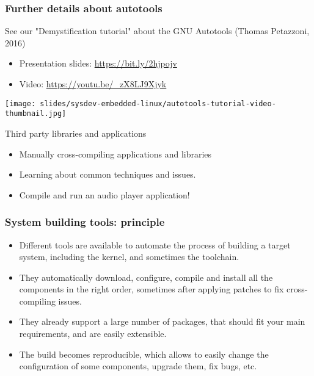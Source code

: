 \begin{frame}
  \frametitle{Further details about autotools}
  See our "Demystification tutorial" about the GNU Autotools (Thomas Petazzoni, 2016)
  \begin{itemize}
     \item Presentation slides: \url{https://bit.ly/2hjpojv}
     \item Video: \url{https://youtu.be/_zX8LJ9Xjyk}
  \end{itemize}
  \vfill
  \texttt{[image: slides/sysdev-embedded-linux/autotools-tutorial-video-thumbnail.jpg]}
\end{frame}

\setuplabframe
{Third party libraries and applications}
{
  \begin{itemize}
  \item Manually cross-compiling applications and libraries
  \item Learning about common techniques and issues.
  \item Compile and run an audio player application!
  \end{itemize}
}

\begin{frame}
  \frametitle{System building tools: principle}
  \begin{itemize}
  \item Different tools are available to automate the process of
    building a target system, including the kernel, and sometimes the
    toolchain.
  \item They automatically download, configure, compile and install
    all the components in the right order, sometimes after applying
    patches to fix cross-compiling issues.
  \item They already support a large number of packages, that should
    fit your main requirements, and are easily extensible.
  \item The build becomes reproducible, which allows to easily change
    the configuration of some components, upgrade them, fix bugs, etc.
  \end{itemize}
\end{frame}


